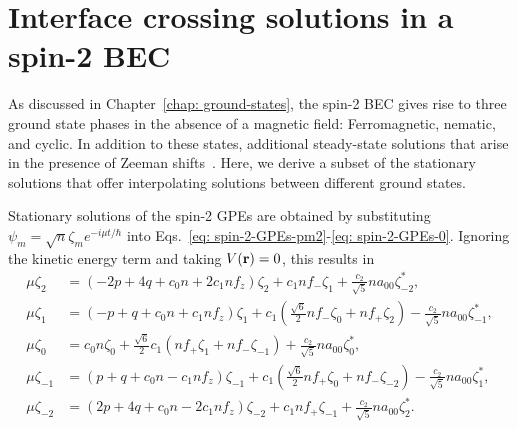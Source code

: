 \section{Interface crossing solutions in a spin-2 BEC}
As discussed in Chapter~\ref{chap: ground-states}, the spin-2 BEC gives rise to
three ground state phases in the absence of a magnetic field: Ferromagnetic,
nematic, and cyclic.
In addition to these states, additional steady-state solutions that arise in
the presence of Zeeman shifts~\cite{Kawaguchi2012}.
Here, we derive a subset of the stationary solutions that offer interpolating
solutions between different ground states.

Stationary solutions of the spin-2 GPEs are obtained by substituting
\(\psi_m = \sqrt{n}\zeta_m e^{-i\mu t/\hbar}\) into
Eqs.~\eqref{eq: spin-2-GPEs-pm2}-\eqref{eq: spin-2-GPEs-0}.
Ignoring the kinetic energy term and taking \(V(\vb{r}) = 0\), this results
in
\begin{align}
    \mu\zeta_2    & = \left(-2p + 4q + c_0n +2c_1nf_z\right)\zeta_2
    + c_1nf_-\zeta_1 + \frac{c_2}{\sqrt{5}}na_{00}\zeta^*_{-2},            \\
    \mu\zeta_1    & = \left(-p + q + c_0n +c_1nf_z\right)\zeta_1
    + c_1\left(\frac{\sqrt{6}}{2}nf_-\zeta_0 +nf_+\zeta_2\right)
    - \frac{c_2}{\sqrt{5}}na_{00}\zeta^*_{-1},                             \\
    \mu\zeta_0    & = c_0n\zeta_0 + \frac{\sqrt{6}}{2}c_1\left(nf_+\zeta_1
    + nf_-\zeta_{-1}\right) + \frac{c_2}{\sqrt{5}}na_{00}\zeta_0^*,        \\
    \mu\zeta_{-1} & = \left(p + q + c_0n - c_1nf_z\right)\zeta_{-1}
    + c_1\left(\frac{\sqrt{6}}{2}nf_+\zeta_0 +nf_-\zeta_{-2}\right)
    - \frac{c_2}{\sqrt{5}}na_{00}\zeta^*_{1},                              \\
    \mu\zeta_{-2} & = \left(2p + 4q + c_0n - 2c_1nf_z\right)\zeta_{-2}
    + c_1nf_+\zeta_{-1} + \frac{c_2}{\sqrt{5}}na_{00}\zeta^*_{2}.          \\
\end{align}

